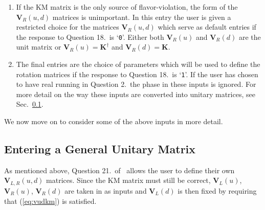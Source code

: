 \begin{enumerate}
\item If the KM matrix is the only source of flavor-violation, the form of the ${\mathbf{V}}_{R}(u,d)$ matrices is unimportant. In this entry the user is given a restricted choice for the matrices ${\mathbf{V}}_{R}(u,d)$ which serve as default entries if the response to Question 18.~is `\verb+0+'. Either both ${\mathbf{V}}_{R}(u)$ and ${\mathbf{V}}_{R}(d)$ are the unit matrix or ${\mathbf{V}}_{R}(u)={\mathbf{K}}^{\dagger}$ and ${\mathbf{V}}_{R}(d)={\mathbf{K}}$.
\item The final entries are the choice of parameters which will be used to define the rotation matrices if the response to Question 18.~is `\verb+1+'. If the user has chosen to have real running in Question 2.~the phase in these inputs is ignored. For more detail on the way these inputs are converted into unitary matrices, see Sec.~\ref{sec:genu}.
\end{enumerate} We now move on to consider some of the above inputs in
more detail.

\subsection{Entering a General Unitary Matrix}\label{sec:genu}

As mentioned above, Question 21.~of \inrge~allows the user to define
their own ${\mathbf{V}}_{L,R}(u,d)$ matrices. Since the KM matrix must
still be correct, ${\mathbf{V}}_L(u)$, ${\mathbf{V}}_R(u)$,
${\mathbf{V}}_R(d)$ are taken in as inputs and ${\mathbf{V}}_L(d)$ is
then fixed by requiring that (\ref{eq:vudkm}) is satisfied.

